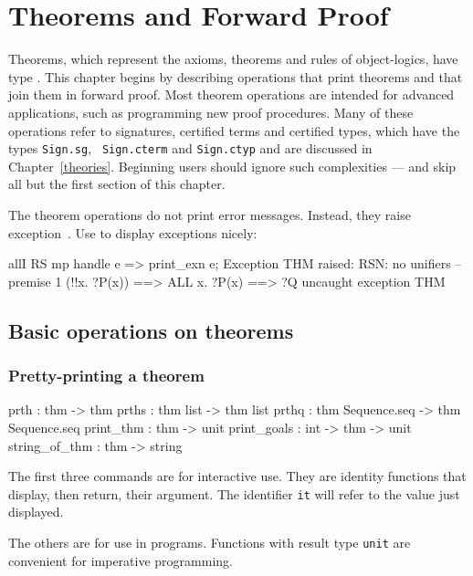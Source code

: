 \chapter{Theorems and Forward Proof}

Theorems, which represent the axioms, theorems and rules of object-logics,
have type .  This chapter begins by describing operations that
print theorems and that join them in forward proof.  Most theorem
operations are intended for advanced applications, such as programming new
proof procedures.  Many of these operations refer to signatures, certified
terms and certified types, which have the \ML{} types {\tt Sign.sg}, {\tt
  Sign.cterm} and {\tt Sign.ctyp} and are discussed in
Chapter~\ref{theories}.  Beginning users should ignore such complexities
--- and skip all but the first section of this chapter.

The theorem operations do not print error messages.  Instead, they raise
exception~\@.  Use  to display
exceptions nicely:
\begin{ttbox} 
allI RS mp  handle e => print_exn e;
{\out Exception THM raised:}
{\out RSN: no unifiers -- premise 1}
{\out (!!x. ?P(x)) ==> ALL x. ?P(x)}
{\out [| ?P --> ?Q; ?P |] ==> ?Q}
{\out}
{\out uncaught exception THM}
\end{ttbox}


\section{Basic operations on theorems}
\subsection{Pretty-printing a theorem}
\begin{ttbox} 
prth          : thm -> thm
prths         : thm list -> thm list
prthq         : thm Sequence.seq -> thm Sequence.seq
print_thm     : thm -> unit
print_goals   : int -> thm -> unit
string_of_thm : thm -> string
\end{ttbox}
The first three commands are for interactive use.  They are identity
functions that display, then return, their argument.  The \ML{} identifier
{\tt it} will refer to the value just displayed.

The others are for use in programs.  Functions with result type {\tt unit}
are convenient for imperative programming.

